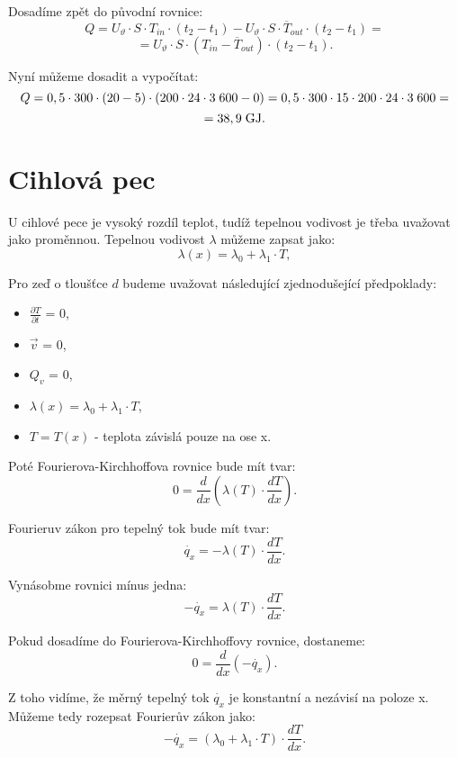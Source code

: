 \documentclass{article}
\begin{document}
Dosadíme zpět do původní rovnice:
$$
    Q = U_\vartheta \cdot S \cdot T_{in} \cdot (t_2 - t_1) - U_\vartheta \cdot S \cdot \overline{T}_{out} \cdot (t_2 - t_1) =
$$
$$
    = U_\vartheta \cdot S \cdot (T_{in} - \overline{T}_{out}) \cdot (t_2 - t_1).
$$

Nyní můžeme dosadit a vypočítat:
$$
    Q = 0,5 \cdot 300 \cdot (20 - 5) \cdot (200 \cdot 24 \cdot 3 \; 600 - 0) = 0,5 \cdot 300 \cdot 15 \cdot 200 \cdot 24 \cdot 3 \; 600 =
$$
$$
    = 38,9 \; \textrm{GJ}.
$$

\newpage



\section{ Cihlová pec \spicy \spicy \spicy \spicy}
U cihlové pece je vysoký rozdíl teplot, tudíž tepelnou vodivost je třeba uvažovat jako proměnnou. Tepelnou vodivost $\lambda$ můžeme zapsat jako:
$$
    \lambda (x) = \lambda_0 + \lambda_1 \cdot T,
$$

Pro zeď o tloušťce $d$ budeme uvažovat následující zjednodušející předpoklady:
\begin{itemize}
    \item $\frac{\partial T}{\partial t}$ = 0,
    \item $\vec{v}$ = 0,
    \item $Q_v$ = 0,
    \item $\lambda (x) = \lambda_0 + \lambda_1 \cdot T$,
    \item $T = T(x)$ - teplota závislá pouze na ose x.
\end{itemize}

Poté Fourierova-Kirchhoffova rovnice bude mít tvar:
$$
    0 = \frac{d}{dx} \left ( \lambda (T) \cdot \frac{dT}{dx} \right ).
$$

Fourieruv zákon pro tepelný tok bude mít tvar:
$$
    \dot{q_x} = - \lambda (T) \cdot \frac{dT}{dx}.
$$

Vynásobme rovnici mínus jedna:
$$
    - \dot{q_x} = \lambda (T) \cdot \frac{dT}{dx}.
$$

Pokud dosadíme do Fourierova-Kirchhoffovy rovnice, dostaneme:
$$
    0 = \frac{d}{dx} \left ( - \dot{q_x} \right ).
$$

Z toho vidíme, že měrný tepelný tok $\dot{q_x}$ je konstantní a nezávisí na poloze x. Můžeme tedy rozepsat Fourierův zákon jako:
$$
    - \dot{q_x} = \left( \lambda_0 + \lambda_1 \cdot T \right) \cdot \frac{dT}{dx}.
$$
\end{document}
